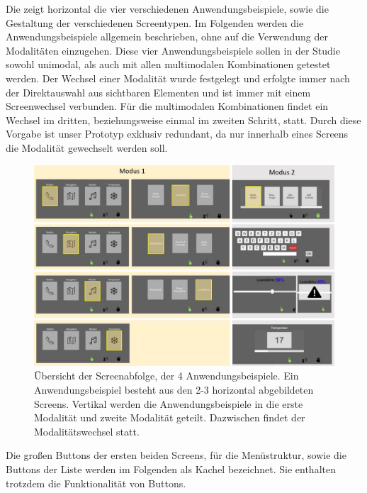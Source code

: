 Die  zeigt horizontal die vier verschiedenen Anwendungsbeispiele, sowie die Gestaltung der verschiedenen Screentypen.  
Im Folgenden werden die Anwendungsbeispiele allgemein beschrieben, ohne auf die Verwendung der Modalitäten einzugehen. 
Diese vier Anwendungsbeispiele sollen in der Studie sowohl unimodal, als auch mit allen multimodalen Kombinationen getestet werden. 
Der Wechsel einer Modalität wurde festgelegt und erfolgte immer nach der Direktauswahl aus sichtbaren Elementen und ist immer mit einem Screenwechsel verbunden. Für die multimodalen Kombinationen findet ein Wechsel im dritten, beziehungsweise einmal im zweiten Schritt, statt.
Durch diese Vorgabe ist unser Prototyp exklusiv redundant, da nur innerhalb eines Screens die Modalität gewechselt werden soll. 

\begin{landscape}
\begin{figure}[ht]
  \centering
\includegraphics[height=0.9\textheight]{img/UseCases2.jpg}
  \caption[Übersicht der Screenabfolge, der 4 Anwendungsbeispiele.]{Übersicht der Screenabfolge, der 4 Anwendungsbeispiele. Ein Anwendungsbeispiel besteht aus den 2-3 horizontal abgebildeten Screens. Vertikal werden die Anwendungsbeispiele in die erste Modalität und zweite Modalität geteilt. Dazwischen findet der Modalitätswechsel statt.}
  \label{fig:UseCases}
	\end{figure}
\end{landscape}
Die großen Buttons der ersten beiden Screens, für die Menüstruktur, sowie die Buttons der Liste werden im Folgenden als Kachel bezeichnet. 
Sie enthalten trotzdem die Funktionalität von Buttons. 

